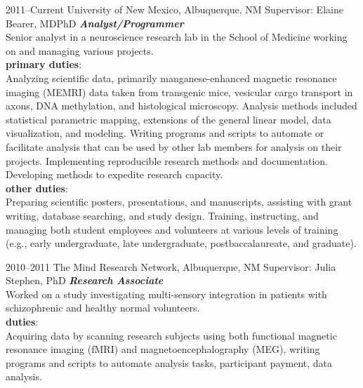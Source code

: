 \documentclass[]{friggeri-cv} %
\begin{document}
\begin{entrylist}
\entry
{\footnotesize{2011--Current}}
{University of New Mexico, Albuquerque, NM \textemdash Supervisor: Elaine Bearer, MD\textendash PhD}
{}
{\emph{\textbf{Analyst/Programmer}} \\
Senior analyst in a neuroscience research lab in the School of Medicine 
working on and managing various projects. \\
\textbf{primary duties}: \\
Analyzing scientific data, primarily manganese-enhanced magnetic resonance imaging (MEMRI) data 
taken from transgenic mice,
vesicular cargo transport in axons, 
DNA methylation, and histological microscopy. Analysis methods included
statistical parametric mapping, 
extensions of the general linear model, 
data visualization, and modeling.
Writing programs and scripts to automate or facilitate analysis 
that can be used by other lab members for analysis on their projects. 
Implementing reproducible research methods and documentation. 
Developing methods to expedite research capacity. \\
\textbf{other duties}: \\
Preparing scientific posters, presentations, and manuscripts, 
assisting with grant writing, database searching, and study design. 
Training, instructing, and managing both student employees and volunteers at various levels of training 
(e.g., early undergraduate, late undergraduate, postbaccalaureate, and graduate). }
\end{entrylist}

\begin{entrylist}
\entry
{\footnotesize{2010--2011}}
{The Mind Research Network, Albuquerque, NM \textemdash Supervisor: Julia Stephen, PhD}
{}
{\emph{\textbf{Research Associate}} \\
Worked on a study investigating multi-sensory integration in
patients with schizophrenic and healthy normal volunteers. \\
\textbf{duties}:\\
Acquiring data by scanning research subjects using both functional
magnetic resonance imaging (fMRI) and magnetoencephalography (MEG), writing
programs and scripts to automate analysis tasks, 
participant payment, data analysis.}
\end{entrylist}
\end{document}
